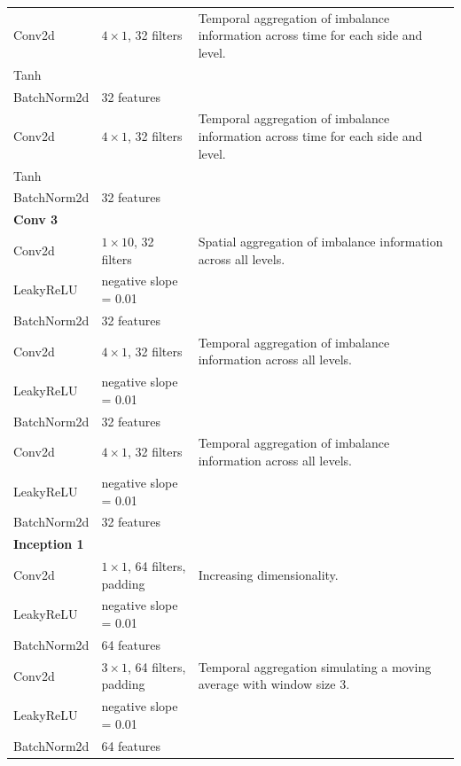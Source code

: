 \documentclass[a4paper, oneside, notitlepage]{book}
\begin{document}
\begin{table}[ht]
{\begin{tabular}{|l|l|l|}
                \quad Conv2d & $4 \times 1$, 32 filters & Temporal aggregation of imbalance information across time for each side and level.\\
                \quad Tanh & & \\
                \quad BatchNorm2d & 32 features & \\
                \quad Conv2d & $4 \times 1$, 32 filters & Temporal aggregation of imbalance information across time for each side and level.\\
                \quad Tanh & & \\
                \quad BatchNorm2d & 32 features & \\
                \hline
                \textbf{Conv 3} & & \\
                \quad Conv2d & $1 \times 10$, 32 filters & Spatial aggregation of imbalance information across all levels.\\
                \quad LeakyReLU & negative slope = 0.01 & \\
                \quad BatchNorm2d & 32 features & \\
                \quad Conv2d & $4 \times 1$, 32 filters & Temporal aggregation of imbalance information across all levels.\\
                \quad LeakyReLU & negative slope = 0.01 & \\
                \quad BatchNorm2d & 32 features & \\
                \quad Conv2d & $4 \times 1$, 32 filters & Temporal aggregation of imbalance information across all levels.\\
                \quad LeakyReLU & negative slope = 0.01 & \\
                \quad BatchNorm2d & 32 features & \\
                \hline
                \textbf{Inception 1} & & \\
                \quad Conv2d & $1 \times 1$, 64 filters, padding  & Increasing dimensionality.\\
                \quad LeakyReLU & negative slope = 0.01 & \\
                \quad BatchNorm2d & 64 features & \\
                \quad Conv2d & $3 \times 1$, 64 filters, padding  & Temporal aggregation simulating a moving average with window size 3.\\
                \quad LeakyReLU & negative slope = 0.01 & \\
                \quad BatchNorm2d & 64 features & \\

\end{tabular}}
\end{table}
\end{document}
